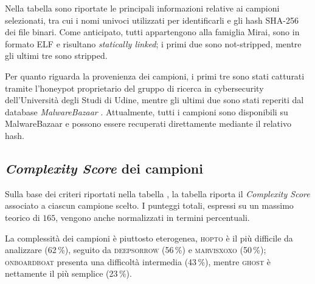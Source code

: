 Nella tabella  sono riportate le principali informazioni relative ai campioni selezionati, tra cui i nomi univoci utilizzati per identificarli e gli hash SHA-256 dei file binari. Come anticipato, tutti appartengono alla famiglia Mirai, sono in formato ELF e risultano \emph{statically linked}; i primi due sono not-stripped, mentre gli ultimi tre sono stripped.

\begin{table}[t]
    \centering
    \caption[Caratteristiche principali dei campioni selezionati]{Caratteristiche principali dei campioni di malware selezionati per la campagna sperimentale.}
    \label{tab:malware_samples}
\end{table}

Per quanto riguarda la provenienza dei campioni, i primi tre sono stati catturati tramite l'honeypot proprietario del gruppo di ricerca in cybersecurity dell'Università degli Studi di Udine, mentre gli ultimi due sono stati reperiti dal database \emph{MalwareBazaar} \cite{malwarebazaar2026browse}. Attualmente, tutti i campioni sono disponibili su MalwareBazaar e possono essere recuperati direttamente mediante il relativo hash.

\subsection{\emph{Complexity Score} dei campioni} %

Sulla base dei criteri riportati nella tabella , la tabella  riporta il \emph{Complexity Score} associato a ciascun campione scelto. I punteggi totali, espressi su un massimo teorico di $165$, vengono anche normalizzati in termini percentuali.

\begin{table}[t]
    \centering
    \caption[\emph{Complexity Score} dei campioni selezionati]{\emph{Complexity Score} dei campioni di malware selezionati per la campagna sperimentale.}
    \label{tab:complexity_scores}
\end{table}

La complessità dei campioni è piuttosto eterogenea, \textsc{hopto} è il più difficile da analizzare (62\,\%), seguito da \textsc{deepsorrow} (56\,\%) e \textsc{marvisxoxo} (50\,\%); \textsc{onboardboat} presenta una difficoltà intermedia (43\,\%), mentre \textsc{ghost} è nettamente il più semplice (23\,\%).

